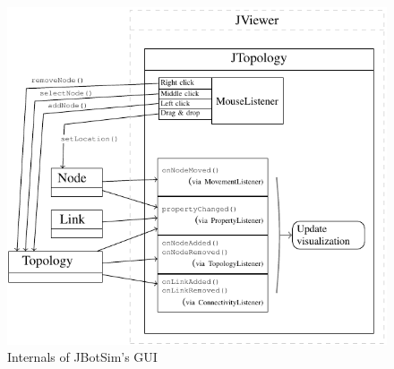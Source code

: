 \begin{figure}[h!]
	\centering
	\includegraphics[width=.7\linewidth]{fig_6}
	\caption[Internals of JBotSim’s GUI]{Internals of JBotSim’s GUI}
	\label{fig:fig6}
\end{figure}
